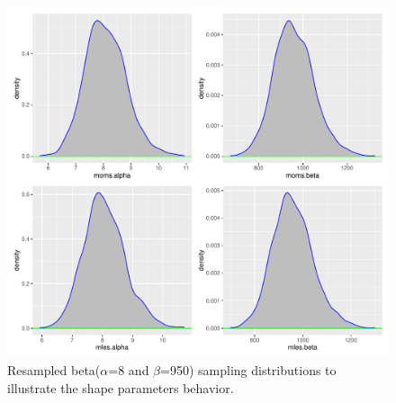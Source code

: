 \documentclass{article}\usepackage[]{graphicx}\usepackage[]{xcolor}
\begin{document}
\begin{figure}[ht]
  \begin{center}
  \includegraphics[width=\textwidth]{Rplot02.pdf}
  \caption{Resampled beta($\alpha$=8 and $\beta$=950) sampling distributions to illustrate the shape parameters behavior.}
  \label{plot3}
  \end{center}
\end{figure}
\end{document}
